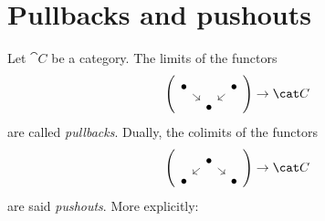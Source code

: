 
\section{Pullbacks and pushouts}

Let \(\cat C\) be a category. The limits of the functors
\[\left(\begin{tikzcd}[sep=tiny]
\bullet \ar[dr] &         & \bullet \ar[dl] \\
                & \bullet &
\end{tikzcd}\right) \to \cat C\]
are called {\em pullbacks}. Dually, the colimits of the functors
\[\left(\begin{tikzcd}[sep=tiny]
        & \bullet \ar[dl] \ar[dr] &         \\
\bullet &                         & \bullet
\end{tikzcd} \right) \to \cat C\]
are said {\em pushouts}. More explicitly:

